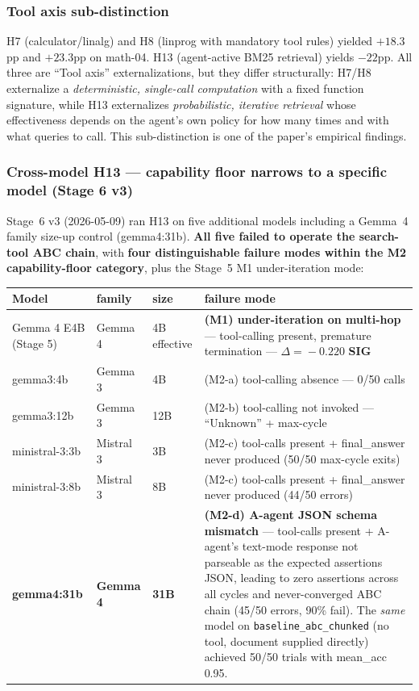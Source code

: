 \documentclass[11pt]{article}
\newcommand{\code}[1]{\texttt{#1}}
\newcommand{\sig}{\textbf{SIG}}
\begin{document}
\subsubsection{Tool axis sub-distinction}
H7 (calculator/linalg) and H8 (linprog with mandatory tool rules) yielded $+18.3$pp and $+23.3$pp on math-04. H13 (agent-active BM25 retrieval) yields $-22$pp. All three are ``Tool axis'' externalizations, but they differ structurally: H7/H8 externalize a \emph{deterministic, single-call computation} with a fixed function signature, while H13 externalizes \emph{probabilistic, iterative retrieval} whose effectiveness depends on the agent's own policy for how many times and with what queries to call. This sub-distinction is one of the paper's empirical findings.

\subsubsection{Cross-model H13 --- capability floor narrows to a specific model (Stage 6 v3)}\label{sec:cross-h13}

Stage~6 v3 (2026-05-09) ran H13 on five additional models including a Gemma~4 family size-up control (gemma4:31b). \textbf{All five failed to operate the search-tool ABC chain}, with \textbf{four distinguishable failure modes within the M2 capability-floor category}, plus the Stage~5 M1 under-iteration mode:

\begin{table}[h]
\centering
\small
\begin{tabular}{@{}p{}p{}p{}p{}@{}}
\toprule
Model & family & size & failure mode \\
\midrule
Gemma 4 E4B (Stage 5) & Gemma 4 & 4B effective & \textbf{(M1) under-iteration on multi-hop} --- tool-calling present, premature termination --- $\Delta\!=\!-0.220$ \sig{} \\
gemma3:4b & Gemma 3 & 4B & (M2-a) tool-calling absence --- 0/50 calls \\
gemma3:12b & Gemma 3 & 12B & (M2-b) tool-calling not invoked --- ``Unknown'' + max-cycle \\
ministral-3:3b & Mistral 3 & 3B & (M2-c) tool-calls present + final\_answer never produced (50/50 max-cycle exits) \\
ministral-3:8b & Mistral 3 & 8B & (M2-c) tool-calls present + final\_answer never produced (44/50 errors) \\
\textbf{gemma4:31b} & \textbf{Gemma 4} & \textbf{31B} & \textbf{(M2-d) A-agent JSON schema mismatch} --- tool-calls present + A-agent's text-mode response not parseable as the expected assertions JSON, leading to zero assertions across all cycles and never-converged ABC chain (45/50 errors, 90\% fail). The \emph{same} model on \code{baseline\_abc\_chunked} (no tool, document supplied directly) achieved 50/50 trials with mean\_acc 0.95. \\
\bottomrule
\end{tabular}
\end{table}
\end{document}
